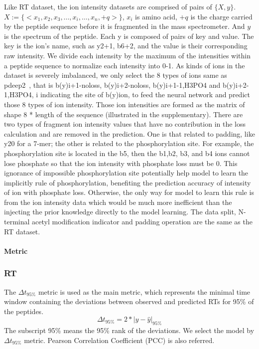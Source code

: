 Like RT dataset, the ion intensity datasets are comprised of pairs of
\( \{X, y\} \). $X := \{ <x_1, x_2, x_3,\dots, x_i, \dots, x_n, +q> \}$, $x_i$ is amino acid, $+q$
is the charge carried by the
peptide sequence before it is fragmented in the mass spectrometer. And \( y \) is the spectrum of the peptide. Each y is composed of pairs of key and value.
The key is the ion's name, such as y2+1, b6+2, and the value is their corresponding raw intensity.
We divide each intensity by the maximum of the intensities within a peptide sequence to normalize each intensity into 0-1. As kinds of ions in the dataset is severely imbalanced, we only select the 8 types of ions same as pdeep2~\cite{zeng2019ms}, that is
b(y)i+1-noloss, b(y)i+2-noloss, b(y)i+1-1,H3PO4 and b(y)i+2-1,H3PO4, i indicating the site of b(y)ion,
to feed the neural network and predict those 8 types of ion intensity. Those ion intensities are formed as the matrix of shape 8 * length of the sequence (illustrated in the supplementary).
There are two types of fragment ion intensity values that have no contribution in the loss calculation and are removed in the prediction. One is that related to padding, like y20 for a 7-mer; the other is related to the phosphorylation site. For example, the phosphorylation site is located in the b5, then the b1,b2, b3, and b4 ions cannot lose phosphate so that the ion intensity with phosphate loss must be 0. This ignorance of impossible phosphorylation site potentially help model to learn the implicitly rule of phosphorylation, benefiting the prediction accuracy of intensity of ion with phosphate loss. Otherwise, the only way for model to learn this rule is from the ion intensity data which would be much more inefficient than the injecting the prior knowledge directly to the model learning.
The data split, N-terminal acetyl modification indicator and padding operation are the same as the RT dataset.


\paragraph*{Metric}
\subsubsection*{RT}
The $\Delta$$t_{95\%}$ metric is used as the main metric, which represents
the minimal time window containing the deviations between observed and predicted RTs for 95\% of
the peptides.
\[ \Delta t_{95\%} = 2 * | y - \hat{y} |_{95\%} \]
The subscript 95\% means the 95\% rank of the deviations.
We select the model by $\Delta$$t_{95\%}$ metric.
Pearson Correlation Coefficient (PCC) is also referred.
